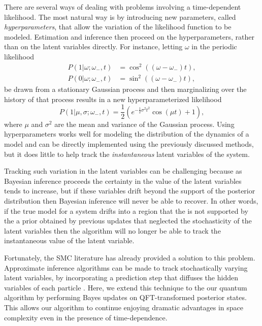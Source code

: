 \documentclass[aps,amsmath,onecolumn,amssymb]{revtex4}
\begin{document}
There are several ways of dealing with problems involving a time-dependent
likelihood. The most natural way is by introducing new parameters, called
\emph{hyperparameters}, that allow the variation of the likelihood function to
be modeled. Estimation and inference then proceed on the hyperparameters,
rather than on the latent variables directly. For instance, letting $\omega$
in the periodic likelihood 
\begin{align}
P(1 | \omega; \omega_-, t) &= \cos^2 ((\omega-\omega_-)  t),\nonumber\\
P(0 | \omega; \omega_-, t) &= \sin^2 ((\omega-\omega_-)  t),\label{eq:simple-precession}
\end{align}
 be drawn from a stationary Gaussian
process and then marginalizing over the history of that process results in a
new hyperparameterized likelihood
\begin{equation}
    P(1 | \mu, \sigma; \omega_-, t) = \frac{1}{2} \left(e^{-\frac{1}{2} \sigma ^2 t^2} \cos (\mu  t)+1\right),
\end{equation}
where $\mu$ and $\sigma^2$ are the mean and variance of the Gaussian process.
Using hyperparameters works well for modeling the distribution of the
dynamics of a model and can be directly implemented using the previously
discussed methods, but it does little to help track the \emph{instantaneous}
latent variables of the system.


Tracking such variation in the latent variables can be 
challenging because as Bayesian inference proceeds the certainty in the
value of the latent variables tends to increase, but if these variables drift beyond the support of the posterior distribution
then Bayesian inference will never be able to recover. 
In other words, if the true model for a system drifts into a region that the is not supported by the a prior obtained by previous updates that neglected
the stochasticity of the latent variables then the algorithm will no longer be able to track the instantaneous value of the latent variable.


Fortunately, the SMC literature has already provided a solution to this problem.  Approximate inference algorithms can
be made to track stochastically varying latent variables, by incorporating a prediction step that diffuses the hidden variables
of each particle \cite{isard_condensationconditional_1998}. Here, we extend this technique to the our
quantum algorithm by performing Bayes updates on QFT-transformed posterior
states. This allows our algorithm to continue enjoying dramatic advantages
in space complexity even in the presence of time-dependence.
\end{document}
